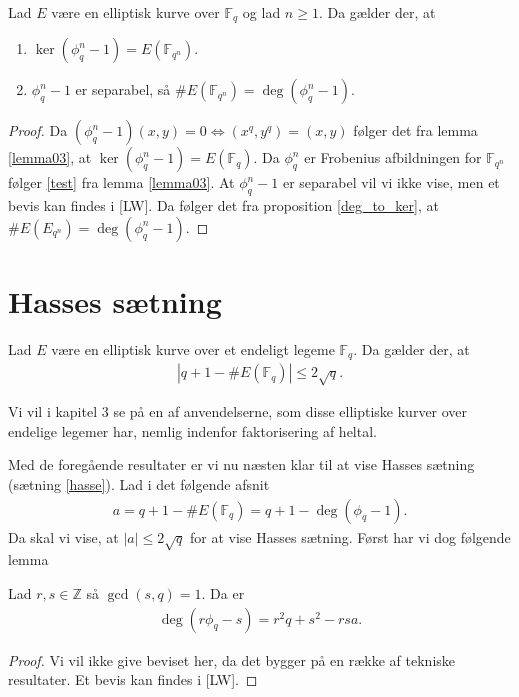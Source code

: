 \begin{proposition}
\label{prop_imp}
Lad $E$ være en elliptisk kurve over $\mathbb{F}_q$ og lad $n \geq 1$. Da gælder der,
at 
\begin{enumerate}
	\item $\ker (\phi_{q}^n - 1) = E(\mathbb{F}_{q^n})$. \label{test}
	\item $\phi_{q}^{n}-1$ er separabel, så $\#E(\mathbb{F}_{q^n})=\deg (\phi_{q}^{n}-1)$. 
\end{enumerate}
\end{proposition}
\begin{proof}
Da $(\phi_{q}^{n} - 1)(x,y) = 0 \Leftrightarrow (x^q, y^q) = (x, y)$ følger det fra
lemma \ref{lemma03}, at $\ker(\phi_{q}^{n}-1)=E(\mathbb{F}_q)$.
Da $\phi_{q}^{n}$ er Frobenius afbildningen for $\mathbb{F}_{q^n}$ følger \eqref{test} fra lemma \ref{lemma03}. At $\phi_{q}^{n} -1$ er separabel vil vi ikke vise, men et bevis kan findes
i [LW]. Da følger det fra proposition \ref{deg_to_ker}, at $\#E(E_{q^n})=\deg(\phi_{q}^{n} -1)$.
\end{proof}

\section{Hasses sætning}

\begin{thm}[Hasse]
\label{hasse}
Lad $E$ være en elliptisk kurve over et endeligt legeme $\mathbb{F}_q$. Da gælder der, at 
\begin{align*}
	|q + 1 - \#E(\mathbb{F}_q)| \leq 2 \sqrt{q}.
\end{align*}
\end{thm}
Vi vil i kapitel 3 se på en af anvendelserne, som disse elliptiske kurver over endelige legemer har, 
nemlig indenfor faktorisering af heltal.


Med de foregående resultater er vi nu næsten klar til at vise Hasses sætning (sætning \ref{hasse}). Lad i det følgende afsnit
\begin{align}
	\label{hasse_as}
	a = q + 1 - \#E(\mathbb{F}_q) = q + 1 - \deg(\phi_q - 1).
\end{align}
Da skal vi vise, at $|a| \leq 2 \sqrt{q}$ for at vise Hasses sætning. Først har vi dog følgende lemma

\begin{lemma}
\label{degree_lemma}
Lad $r, s \in \mathbb{Z}$ så $\gcd(s, q) = 1$. Da er 
\begin{align*}
	\deg(r \phi_q - s) = r^2 q + s^2 - rsa.
\end{align*}
\end{lemma}
\begin{proof}
Vi vil ikke give beviset her, da det bygger på en række af tekniske resultater. Et bevis kan findes i [LW].
\end{proof}

